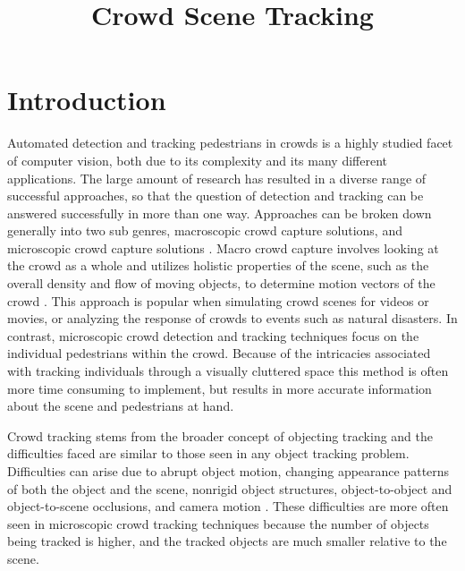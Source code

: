 \documentclass[12pt, onecolumn, conference]{IEEEtran}
\begin{document}
 
\title{Crowd Scene Tracking}

\author{
\and
{}
\and
{}
\and
{}
}

\maketitle

\section{Introduction}

Automated detection and tracking pedestrians in crowds is a highly studied facet of computer vision, both due to its complexity and its many different applications. The large amount of research has resulted in a diverse range of successful approaches, so that the question of detection and tracking can be answered successfully in more than one way. Approaches can be broken down generally into two sub genres, macroscopic crowd capture solutions, and microscopic crowd capture solutions \cite{A. Yilmaz}\cite{M. Thida}. Macro crowd capture involves looking at the crowd as a whole and utilizes holistic properties of the scene, such as the overall density and flow of moving objects, to determine motion vectors of the crowd \cite{M. Thida}. This approach is popular when simulating crowd scenes for videos or movies, or analyzing the response of crowds to events such as natural disasters. In contrast, microscopic crowd detection and tracking techniques focus on the individual pedestrians within the crowd. Because of the intricacies associated with tracking individuals through a visually cluttered space this method is often more time consuming to implement, but results in more accurate information about the scene and pedestrians at hand. 

Crowd tracking stems from the broader concept of objecting tracking and the difficulties faced are similar to those seen in any object tracking problem. Difficulties can arise due to abrupt object motion, changing appearance patterns of both the object and the scene, nonrigid object structures, object-to-object and object-to-scene occlusions, and camera motion \cite{A. Yilmaz}. These difficulties are more often seen in microscopic crowd tracking techniques because the number of objects being tracked is higher, and the tracked objects are much smaller relative to the scene. 
\end{document}
